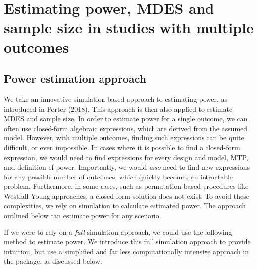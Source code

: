 \documentclass{article}
\begin{document}
\section{Estimating power, MDES and sample size in studies with multiple outcomes}
\label{sec:est}

\subsection{Power estimation approach}
\label{sec:est_power}

We take an innovative simulation-based approach to estimating power, as
introduced in Porter (2018). This approach is then also applied to
estimate MDES and sample size. In order to estimate power for a single
outcome, we can often use closed-form algebraic expressions, which are
derived from the assumed model. However, with multiple outcomes, finding
such expressions can be quite difficult, or even impossible. In cases
where it is possible to find a closed-form expression, we would need to
find expressions for every design and model, MTP, and definition of
power. Importantly, we would \emph{also} need to find new expressions
for any possible number of outcomes, which quickly becomes an
intractable problem. Furthermore, in some cases, such as
permutation-based procedures like Westfall-Young approaches, a
closed-form solution does not exist. To avoid these complexities, we
rely on simulation to calculate estimated power. The approach outlined
below can estimate power for any scenario.

If we were to rely on a \emph{full} simulation approach, we could use
the following method to estimate power. We introduce this full
simulation approach to provide intuition, but use a simplified and far
less computationally intensive approach in the package, as discussed
below.
\end{document}
